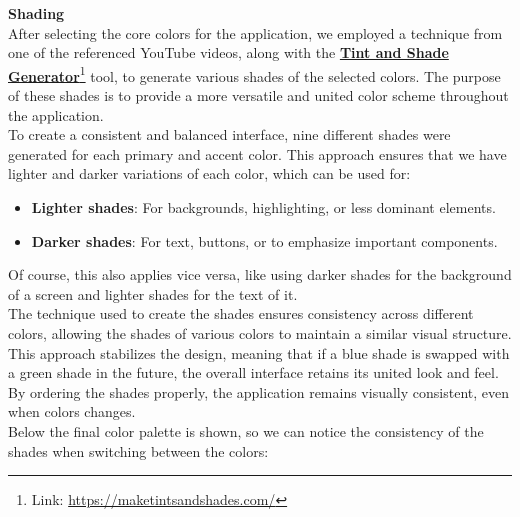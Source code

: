 \noindent \textbf{Shading} \\
After selecting the core colors for the application, we employed a technique from one of the referenced YouTube videos, along with the \textbf{\href{https://maketintsandshades.com/}{Tint and Shade Generator}}\footnote{Link: \url{https://maketintsandshades.com/}} tool, to generate various shades of the selected colors. The purpose of these shades is to provide a more versatile and united color scheme throughout the application.\vspace{5mm} \\
To create a consistent and balanced interface, nine different shades were generated for each primary and accent color. This approach ensures that we have lighter and darker variations of each color, which can be used for:
\begin{itemize}
    \item \textbf{Lighter shades}: For backgrounds, highlighting, or less dominant elements.
    \item \textbf{Darker shades}: For text, buttons, or to emphasize important components.
\end{itemize}
\noindent Of course, this also applies vice versa, like using darker shades for the background of a screen and lighter shades for the text of it.\vspace{5mm} \\
The technique used to create the shades ensures consistency across different colors, allowing the shades of various colors to maintain a similar visual structure. This approach stabilizes the design, meaning that if a blue shade is swapped with a green shade in the future, the overall interface retains its united look and feel. By ordering the shades properly, the application remains visually consistent, even when colors changes.\vspace{5mm} \\
Below the final color palette is shown, so we can notice the consistency of the shades when switching between the colors:

\vspace{5mm}

